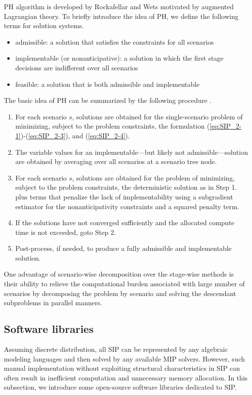 PH algorithm is developed by Rockafellar and Wets motivated by augmented Lagrangian theory. To briefly introduce the idea of PH, we define the following terms for solution systems.
\begin{itemize}
	\item admissible: a solution that satisfies the constraints for all scenarios
	\item implementable (or nonanticipative): a solution in which the first stage decisions are indifferent over all scenarios
	\item feasible: a solution that is both admissible and implementable
\end{itemize}
The basic idea of PH can be summarized by the following procedure \cite{book:pyomo}.
\begin{enumerate}
	\item For each scenario $s$, solutions are obtained for the single-scenario problem of minimizing, subject to the problem constraints, the formulation (\ref{eq:SIP_2-1})-(\ref{eq:SIP_2-3}), and (\ref{eq:SIP_2-4}).
	\item The variable values for an implementable---but likely not admissible---solution are obtained by averaging over all scenarios at a scenario tree node.
	\item For each scenario $s$, solutions are obtained for the problem of minimizing, subject to the problem constraints, the deterministic solution as in Step 1. plus terms that penalize the lack of implementability using a subgradient estimator for the nonanticipativity constraints and a squared penalty term.
	\item If the solutions have not converged sufficiently and the allocated compute time is not exceeded, goto Step 2.
	\item Post-process, if needed, to produce a fully admissible and implementable solution.
\end{enumerate}

One advantage of scenario-wise decomposition over the stage-wise methods is their ability to relieve the computational burden associated with large number of scenarios by decomposing the problem by scenario and solving the descendant subproblems in parallel manners.

\subsection{Software libraries}
Assuming discrete distribution, all SIP can be represented by any algebraic modeling languages and then solved by any available MIP solvers. However, such manual implementation without exploiting structural characteristics in SIP can often result in inefficient computation and unnecessary memory allocation. In this subsection, we introduce some open-source software libraries dedicated to SIP.

